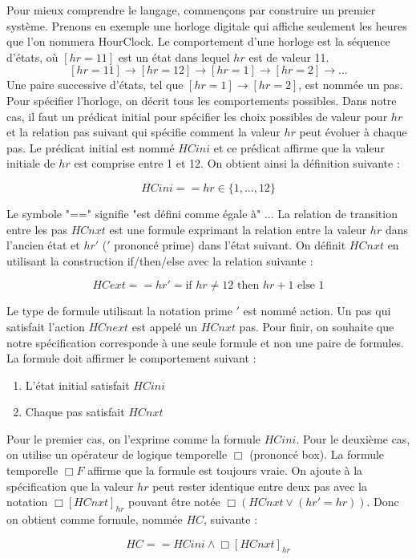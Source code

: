\documentclass[12pt,a4paper]{article}
\begin{document}
Pour mieux comprendre le langage, commençons par construire un premier système. Prenons en exemple une horloge digitale qui affiche seulement les heures que l'on nommera HourClock. Le comportement d'une horloge est la séquence d'états, où $[hr = 11]$ est un état dans lequel $ hr $ est de valeur 11.
$$ [hr = 11] \rightarrow [hr = 12] \rightarrow [hr = 1] \rightarrow [hr = 2] \rightarrow ...$$
Une paire successive d'états, tel que $[hr = 1] \rightarrow [hr = 2]$, est nommée un pas.
Pour spécifier l'horloge, on décrit tous les comportements possibles. Dans notre cas, il faut un prédicat initial pour spécifier les choix possibles de valeur pour $hr$ et la relation pas suivant qui spécifie comment la valeur $hr$ peut évoluer à chaque pas.
Le prédicat initial est nommé $HCini$ et ce prédicat affirme que la valeur initiale de $hr$ est comprise entre 1 et 12. On obtient ainsi la définition suivante :

$$ HCini == hr \in \{1,...,12\}$$

Le symbole "==" signifie "est défini comme égale à" ... 
La relation de transition entre les pas $HCnxt$ est une formule exprimant la relation entre la valeur $hr$ dans l'ancien état et $hr'$ ($'$ prononcé prime) dans l'état suivant. On définit $HCnxt$ en utilisant la construction if/then/else avec la relation suivante :   

$$ HCext == hr' = \text{if } hr \neq 12 \text{ then } hr + 1 \text{ else } 1 $$

Le type de formule utilisant la notation prime $'$ est nommé action. Un pas qui satisfait l'action $HCnext$ est appelé un $HCnxt$ pas.
Pour finir, on souhaite que notre spécification corresponde à une seule formule et non une paire de formules. La formule doit affirmer le comportement suivant :
\begin{enumerate}
	\item L'état initial satisfait $HCini$
	\item Chaque pas satisfait $HCnxt$
\end{enumerate}
Pour le premier cas, on l'exprime comme la formule $HCini$. Pour le deuxième cas, on utilise un opérateur de logique temporelle $\Box$ (prononcé box). La formule temporelle $\Box F$ affirme que la formule est toujours vraie. On ajoute à la spécification que la valeur $hr$ peut rester identique entre deux pas avec la notation $\Box [HCnxt]_{hr}$ pouvant être notée $\Box (HCnxt \lor (hr' = hr ))$. Donc on obtient comme formule, nommée $HC$, suivante :

$$ HC == HCini  \land  \Box [HCnxt]_{hr} $$
\end{document}
